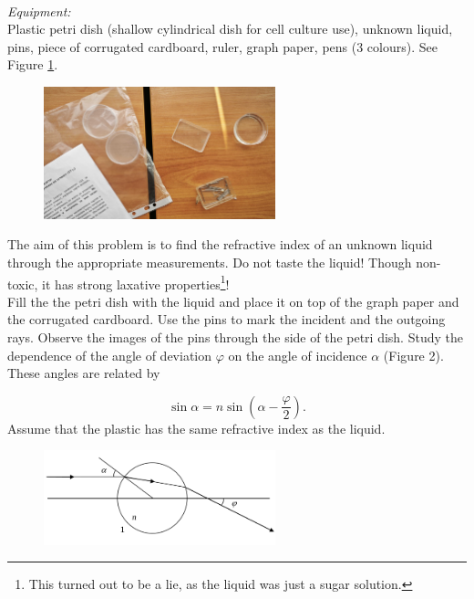 \documentclass[../TST.tex]{subfiles}
\begin{document}
\begin{eproblem}{\ \\[5pt]}
\textit{Equipment:}\\
Plastic petri dish (shallow cylindrical dish for cell culture use), unknown liquid, pins, piece of corrugated cardboard, ruler, graph paper, pens (3 colours). See Figure \ref{fig2}.
\begin{figure}[h]
\centering
\includegraphics[width=0.6\textwidth]{fig/2012_e1.jpg}
\caption{}
\label{fig2}
\end{figure}

The aim of this problem is to find the refractive index of an unknown liquid through the appropriate measurements. Do not taste the liquid! Though non-toxic, it has strong laxative properties\footnote{This turned out to be a lie, as the liquid was just a sugar solution.}!\\[5pt]
Fill the the petri dish with the liquid and place it on top of the graph paper and the corrugated cardboard. Use the pins to mark the incident and the outgoing rays. Observe the images of the pins through the side of the petri dish. Study the dependence of the angle of deviation $\varphi$ on the angle of incidence $\alpha$ (Figure 2). These angles are related by

\begin{equation*}
	\sin{\alpha}=n\sin{\left(\alpha - \frac{\varphi}{2} \right)}
.
\end{equation*}
Assume that the plastic has the same refractive index as the liquid.
\begin{figure}[h]
\centering
\hspace*{0.6cm}
\includegraphics[width=0.6\textwidth]{fig/2012_e2.png}
\caption{}
\label{fig3}
\end{figure}


\end{eproblem}
\end{document}
